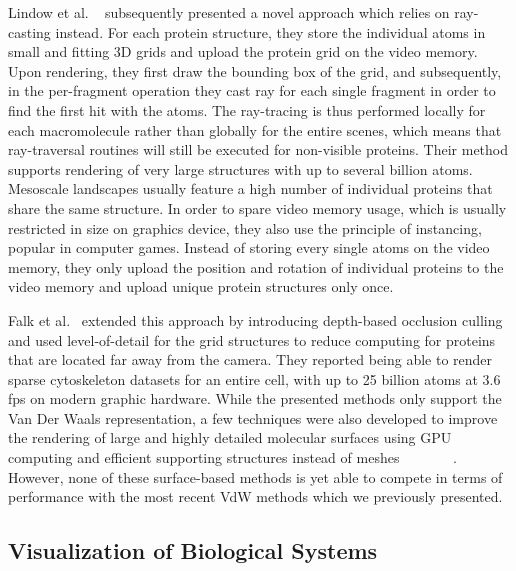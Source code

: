 Lindow et al. ~\cite{lindow2012interactive} subsequently presented a novel approach which relies on ray-casting instead.
For each protein structure, they store the individual atoms in small and fitting 3D grids and upload the protein grid on the video memory.
Upon rendering, they first draw the bounding box of the grid, and subsequently, in the per-fragment operation they cast ray for each single fragment in order to find the first hit with the atoms.
The ray-tracing is thus performed locally for each macromolecule rather than globally for the entire scenes, which means that ray-traversal routines will still be executed for non-visible proteins.
Their method supports rendering of very large structures with up to several billion atoms.
Mesoscale landscapes usually feature a high number of individual proteins that share the same structure.
In order to spare video memory usage, which is usually restricted in size on graphics device, they also use the principle of instancing, popular in computer games.
Instead of storing every single atoms on the video memory, they only upload the position and rotation of individual proteins to the video memory and upload unique protein structures only once.

Falk et al.~\cite{falk2013atomistic} extended this approach by introducing depth-based occlusion culling and used level-of-detail for the grid structures to reduce computing for proteins that are located far away from the camera.
They reported being able to render sparse cytoskeleton datasets for an entire cell, with up to 25 billion atoms at 3.6 fps on modern graphic hardware.
While the presented methods only support the Van Der Waals representation, a few techniques were also developed to improve the rendering of large and highly detailed molecular surfaces using GPU computing and efficient supporting structures instead of meshes ~\cite{krone2012fast}~\cite{parulek2012implicit} ~\cite{parulek2013fast} ~\cite{krone2011parallel} ~\cite{szecsi2012real}. 
However, none of these surface-based methods is yet able to compete in terms of performance with the most recent VdW methods which we previously presented.


\subsection{Visualization of Biological Systems}

